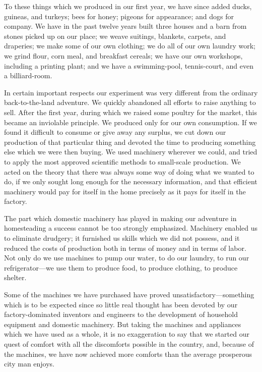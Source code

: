 \documentclass{book}
\begin{document}
To these things which we produced in our first year, we have since added ducks, guineas, and turkeys; bees for honey; pigeons for appearance; and dogs for company. We have in the past twelve years built three houses and a barn from stones picked up on our place; we weave suitings, blankets, carpets, and draperies; we make some of our own clothing; we do all of our own laundry work; we grind flour, corn meal, and breakfast cereals; we have our own workshops, including a printing plant; and we have a swimming-pool, tennis-court, and even a billiard-room.

In certain important respects our experiment was very different from the ordinary back-to-the-land adventure. We quickly abandoned all efforts to raise anything to sell. After the first year, during which we raised some poultry for the market, this became an inviolable principle. We produced only for our own consumption. If we found it difficult to consume or give away any surplus, we cut down our production of that particular thing and devoted the time to producing something else which we were then buying. We used machinery wherever we could, and tried to apply the most approved scientific methods to small-scale production. We acted on the theory that there was always some way of doing what we wanted to do, if we only sought long enough for the necessary information, and that efficient machinery would pay for itself in the home precisely as it pays for itself in the factory.

The part which domestic machinery has played in making our adventure in homesteading a success cannot be too strongly emphasized. Machinery enabled us to eliminate drudgery; it furnished us skills which we did not possess, and it reduced the costs of production both in terms of money and in terms of labor. Not only do we use machines to pump our water, to do our laundry, to run our refrigerator—we use them to produce food, to produce clothing, to produce shelter.

Some of the machines we have purchased have proved unsatisfactory—something which is to be expected since so little real thought has been devoted by our factory-dominated inventors and engineers to the development of household equipment and domestic machinery. But taking the machines and appliances which we have used as a whole, it is no exaggeration to say that we started our quest of comfort with all the discomforts possible in the country, and, because of the machines, we have now achieved more comforts than the average prosperous city man enjoys.
\end{document}
